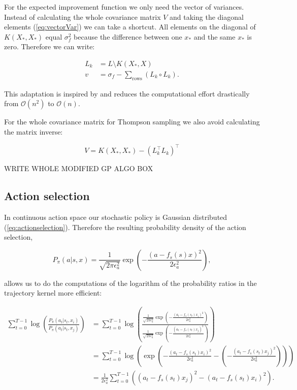 For the expected improvement function we only need the vector of variances. Instead of calculating the whole covariance matrix $V$ and taking the diagonal elements (\ref{eq:vectorVar}) we can take a shortcut. All elements on the diagonal of $K(X_*,X_*)$ equal $\sigma_f^2$ because the difference between one $x_*$ and the same $x_*$ is zero. Therefore we can write:

\begin{align}
    L_k &= L \setminus K(X_*,X) \\
    v &= \sigma_f - \sum_{\text{rows}} (L_k \circ L_k). \label{eq:vectorvar}
\end{align}

This adaptation is inspired by \cite{nandoCode} and reduces the computational effort drastically from $\mathcal{O}(n^2)$ to $\mathcal{O}(n)$.

For the whole covariance matrix for Thompson sampling we also avoid calculating the matrix inverse:

$$V = K(X_*,X_*) - (L_k^\top L_k)^\top $$

WRITE WHOLE MODIFIED GP ALGO BOX

\subsection{Action selection}

In continuous action space our stochastic policy is Gaussian distributed (\ref{eq:actionselection}). Therefore the resulting probability density of the action selection,

$$P_{\pi}(a|s,x) = \frac{1}{\sqrt{2\pi\epsilon_a^2}}\exp\left(-\frac{(a-f_s(s)x)^2}{2\epsilon_a^2}\right),$$

allows us to do the computations of the logarithm of the probability ratios in the trajectory kernel more efficient:

\begin{align*}
    \sum_{t=0}^{T-1} \log \left(\frac{P_{\pi}(a_{t}|s_{t},x_i)}{P_{\pi}(a_{t}|s_{t},x_j)}\right) &= \sum_{t=0}^{T-1} \log \left(\frac{\frac{1}{\sqrt{2\pi\epsilon_a^2}}\exp\left(-\frac{(a_t-f_s(s_t)x_i)^2}{2\epsilon_a^2}\right)}{\frac{1}{\sqrt{2\pi\epsilon_a^2}}\exp\left(-\frac{(a_t-f_s(s_t)x_j)^2}{2\epsilon_a^2}\right)}\right)\\
    &= \sum_{t=0}^{T-1} \log \left( \exp \left( -\frac{(a_t-f_s(s_t)x_i)^2}{2\epsilon_a^2} - \left(-\frac{(a_t-f_s(s_t)x_j)^2}{2\epsilon_a^2}\right)\right)\right)\\
    &= \frac{1}{2\epsilon_a^2} \sum_{t=0}^{T-1} \left((a_t-f_s(s_t)x_j)^2 - (a_t-f_s(s_t)x_i)^2\right).
\end{align*}


